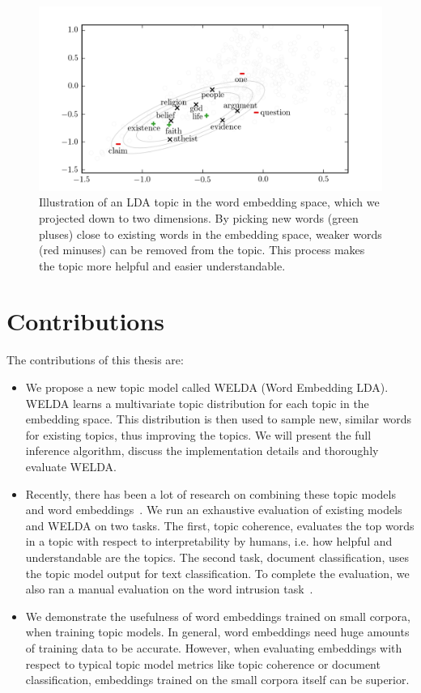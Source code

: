 \documentclass[
        a4paper,
        titlepage,
        twoside,
        parskip
        ]{scrbook}
\theoremstyle{break}
\begin{document}
\begin{figure}
       \centering
       \includegraphics[width=\textwidth]{figures/figure1.png}
       \caption{Illustration of an LDA topic in the word embedding space, which we projected down to two dimensions. By picking new words (green pluses) close to existing words in the embedding space, weaker words (red minuses) can be removed from the topic. This process makes the topic more helpful and easier understandable.}
       \label{fig:figure1}
\end{figure}

\section{Contributions}
The contributions of this thesis are:
\begin{itemize}
  \item
    We propose a new topic model called WELDA (Word Embedding LDA).
    WELDA learns a multivariate topic distribution for each topic in the embedding space.
    This distribution is then used to sample new, similar words for existing topics, thus improving the topics.
    We will present the full inference algorithm, discuss the implementation details and thoroughly evaluate WELDA.
  \item
    Recently, there has been a lot of research on combining these topic models and word embeddings~\cite{Batmanghelich2016,Das2015,Li2016,Nguyen2015}.
    We run an exhaustive evaluation of existing models and WELDA on two tasks.
    The first, topic coherence, evaluates the top words in a topic with respect to interpretability by humans, i.e. how helpful and understandable are the topics.
    The second task, document classification, uses the topic model output for text classification.
    To complete the evaluation, we also ran a manual evaluation on the word intrusion task~\cite{Chang2009}.
  \item
    We demonstrate the usefulness of word embeddings trained on small corpora, when training topic models.
    In general, word embeddings need huge amounts of training data to be accurate.
    However, when evaluating embeddings with respect to typical topic model metrics like topic coherence or document classification, embeddings trained on the small corpora itself can be superior.
\end{itemize}
\end{document}
